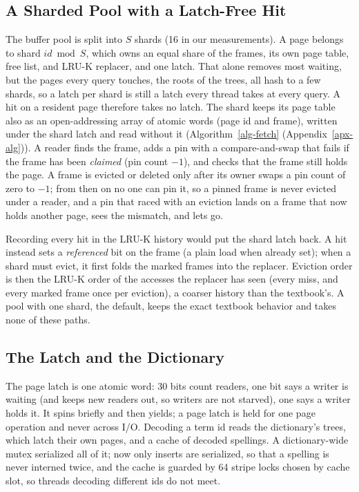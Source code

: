\subsection{A Sharded Pool with a Latch-Free Hit}

The buffer pool is split into $S$ shards (16 in our measurements).
A page belongs to shard $\mathit{id} \bmod S$, which owns an equal share of the
frames, its own page table, free list, and LRU-K replacer, and one latch.
That alone removes most waiting, but the pages every query touches, the roots
of the trees, all hash to a few shards, so a latch per shard is still a latch
every thread takes at every query.
A hit on a resident page therefore takes no latch.
The shard keeps its page table also as an open-addressing array of atomic
words (page id and frame), written under the shard latch and read without it
(Algorithm~\ref{alg-fetch} (Appendix~\ref{apx-alg})).
A reader finds the frame, adds a pin with a compare-and-swap that fails if the
frame has been \emph{claimed} (pin count $-1$), and checks that the frame still
holds the page.
A frame is evicted or deleted only after its owner swaps a pin count of
zero to $-1$; from then on no one can pin it, so a pinned frame is never
evicted under a reader, and a pin that raced with an eviction lands on a frame
that now holds another page, sees the mismatch, and lets go.


Recording every hit in the LRU-K history would put the shard latch back.
A hit instead sets a \emph{referenced} bit on the frame (a plain load when
already set); when a shard must evict, it first folds the marked frames into
the replacer.
Eviction order is then the LRU-K order of the accesses the replacer has seen
(every miss, and every marked frame once per eviction), a coarser history than
the textbook's.
A pool with one shard, the default, keeps the exact textbook behavior and
takes none of these paths.

\subsection{The Latch and the Dictionary}

The page latch is one atomic word: 30 bits count readers, one bit says a
writer is waiting (and keeps new readers out, so writers are not starved), one
says a writer holds it.
It spins briefly and then yields; a page latch is held for one page operation
and never across I/O.
Decoding a term id reads the dictionary's trees, which latch their own
pages, and a cache of decoded spellings.
A dictionary-wide mutex serialized all of it; now only inserts are
serialized, so that a spelling is never interned twice, and the cache is
guarded by 64 stripe locks chosen by cache slot, so threads decoding
different ids do not meet.

